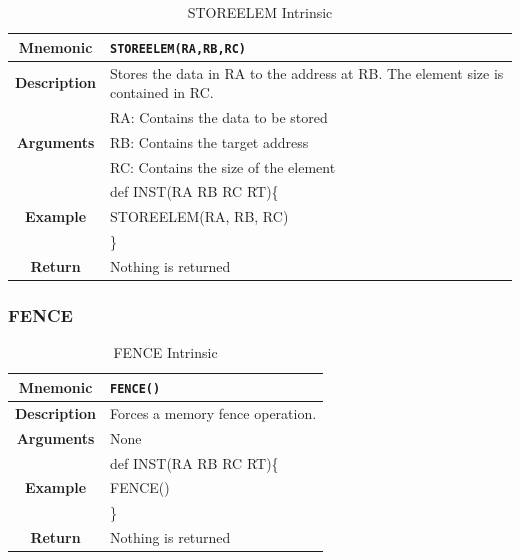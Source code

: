 \documentclass{article}
\begin{document}
\begin{table}[h]
\begin{center}
\caption{STOREELEM Intrinsic}
\vspace{0.125in}
\label{tab:STOREELEMIntrinsic}
\begin{tabular}{|c|l|}
\hline
\textbf{Mnemonic} & \texttt{STOREELEM(RA,RB,RC)}\\
\hline
\textbf{Description} & Stores the data in RA to the address at RB.  The element size is contained in RC.\\
\hline
\multirow{3}{*}{\textbf{Arguments}} & RA: Contains the data to be stored\\
                          			     & RB: Contains the target address \\
			     			     & RC: Contains the size of the element \\
\hline
\multirow{3}{*}{\textbf{Example}} & def INST(RA RB RC RT)\{\\
                          			  &   STOREELEM(RA, RB, RC)\\
                                                    & \}\\
\hline
\textbf{Return} & Nothing is returned\\                                                    
\hline
\end{tabular}
\end{center}
\end{table}

\clearpage
\subsubsection{FENCE}
\label{sec:FENCE}

\begin{table}[h]
\begin{center}
\caption{FENCE Intrinsic}
\vspace{0.125in}
\label{tab:FENCEIntrinsic}
\begin{tabular}{|c|l|}
\hline
\textbf{Mnemonic} & \texttt{FENCE()}\\
\hline
\textbf{Description} & Forces a memory fence operation.\\
\hline
\textbf{Arguments} & None\\
\hline
\multirow{3}{*}{\textbf{Example}} & def INST(RA RB RC RT)\{\\
                          			  &   FENCE()\\
                                                    & \}\\
\hline
\textbf{Return} & Nothing is returned\\
\hline
\end{tabular}
\end{center}
\end{table}
\end{document}

